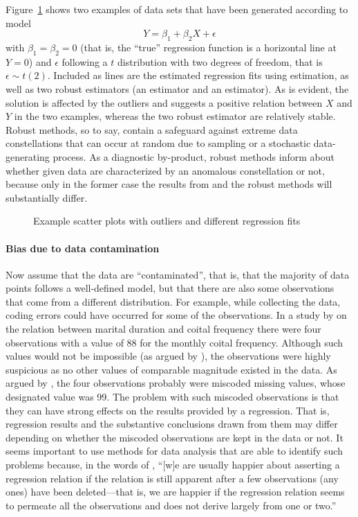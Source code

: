 Figure~\ref{fig:outliers-and-fits} shows two examples of data sets that have
been generated according to model
\[
    Y = \beta_1 + \beta_2 X + \epsilon
\]
with $\beta_1 = \beta_2 = 0$ (that is, the “true” regression function is a
horizontal line at $Y=0$) and $\epsilon$ following a $t$ distribution with two
degrees of freedom, that is $\epsilon \sim t(2)$. Included as lines are the
estimated regression fits using  estimation, as well as two robust
estimators (an  estimator and an  estimator). As is evident,
the  solution is affected by the outliers and suggests a positive
relation between $X$ and $Y$ in the two examples, whereas the two robust
estimator are relatively stable. Robust methods, so to say, contain a safeguard
against extreme data constellations that can occur at random due to sampling or
a stochastic data-generating process. As a diagnostic by-product, robust
methods inform about whether given data are characterized by an anomalous
constellation or not, because only in the former case the results from
 and the robust methods will substantially differ.


\begin{figure}[h!]
    \centering
    \caption{Example scatter plots with outliers and different regression fits}
    \label{fig:outliers-and-fits}
\end{figure}

\paragraph{Bias due to data contamination}

Now assume that the data are “contaminated”, that is, that the majority of data
points follows a well-defined model, but that there are also some observations
that come from a different distribution. For example, while collecting the
data, coding errors could have occurred for some of the observations. In a
study by \citet{jasso85} on the relation between marital duration and coital
frequency there were four observations with a value of 88 for the monthly
coital frequency. Although such values would not be impossible (as argued by
\citealp{jasso85}), the observations were highly suspicious as no other values
of comparable magnitude existed in the data. As argued by \citet{kahnudry86},
the four observations probably were miscoded missing values, whose designated
value was 99. The problem with such miscoded observations is that they can have
strong effects on the results provided by a  regression. That is,
regression results and the substantive conclusions drawn from them may differ
depending on whether the miscoded observations are kept in the data or not. It
seems important to use methods for data analysis that are able to identify such
problems because, in the words of \citet[18]{anscombe73}, “[w]e are usually
happier about asserting a regression relation if the relation is still apparent
after a few observations (any ones) have been deleted---that is, we are happier
if the regression relation seems to permeate all the observations and does not
derive largely from one or two.”

